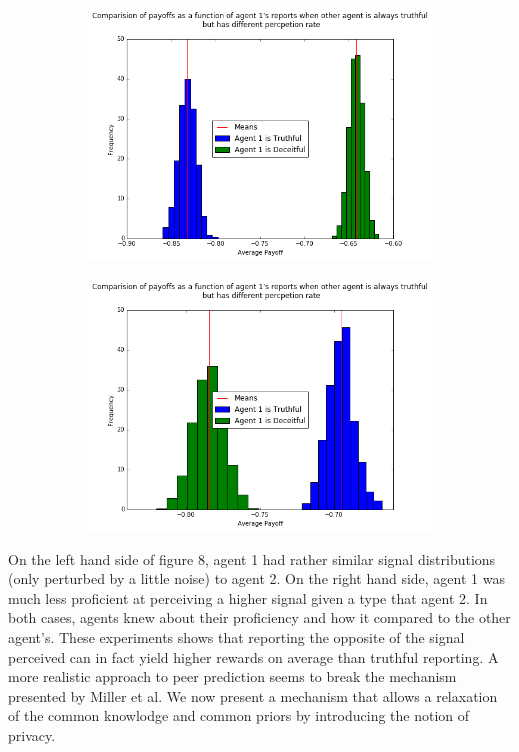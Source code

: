 \documentclass{scrartcl}
\begin{document}
\begin{figure}[H]
\caption{Relaxing Assumption 2}
\begin{subfigure}{0.4\textwidth}
\includegraphics[scale=0.4]{pp_2}
\end{subfigure}
\hspace{0.1\textwidth}
\begin{subfigure}{0.4\textwidth}
\includegraphics[scale=0.4]{pp_3}
\end{subfigure}
\end{figure}

On the left hand side of figure 8, agent 1 had rather similar signal distributions (only perturbed by a little noise) to agent 2. On the right hand side, agent 1 was much less proficient at perceiving a higher signal given a type that agent 2. In both cases, agents knew about their proficiency and how it compared to the other agent's. These experiments shows that reporting the opposite of the signal perceived can in fact yield higher rewards on average than truthful reporting. A more realistic approach to peer prediction seems to break the mechanism presented by Miller et al. We now present a mechanism that allows a relaxation of the common knowlodge and common priors by introducing the notion of privacy.
\end{document}
